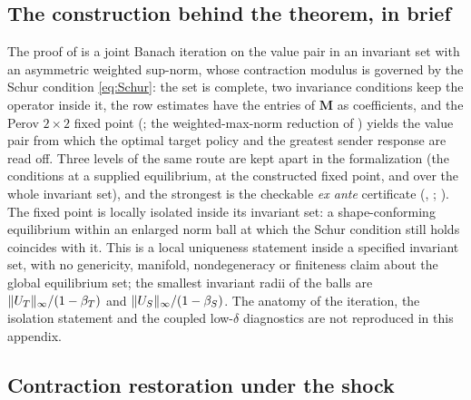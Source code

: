 \subsection{The construction behind the theorem, in brief}
\label{app:jointiteration}

The proof of  is a joint Banach iteration on the value
pair in an invariant set with an asymmetric weighted sup-norm, whose contraction modulus is
governed by the Schur condition \eqref{eq:Schur}: the set is complete, two
invariance conditions keep the operator inside it, the row estimates have the
entries of $\mathbf M$ as coefficients, and the Perov $2\times2$ fixed point
(\citealp{Toda2021}; the weighted-max-norm reduction of
\citealp[\S2]{BertsekasTsitsiklis1996}) yields the value pair from which the
optimal target policy and the greatest sender response are read off. Three
levels of the same route are kept apart in the formalization (the
conditions at a supplied equilibrium, at the constructed fixed point, and
over the whole invariant set), and the strongest is the checkable \emph{ex ante}
certificate (,
;
). The fixed point is locally isolated inside its
invariant set: a shape-conforming equilibrium within an enlarged norm ball at
which the Schur condition still holds coincides with it. This is a local
uniqueness statement inside a specified invariant set, with no genericity,
manifold, nondegeneracy or finiteness claim about the global equilibrium
set; the smallest invariant radii of the balls are
$\|U_T\|_\infty/(1-\beta_T)$ and $\|U_S\|_\infty/(1-\beta_S)$. The anatomy
of the iteration, the isolation statement and the coupled low-$\delta$
diagnostics are not reproduced in this appendix.

\subsection{Contraction restoration under the shock}

